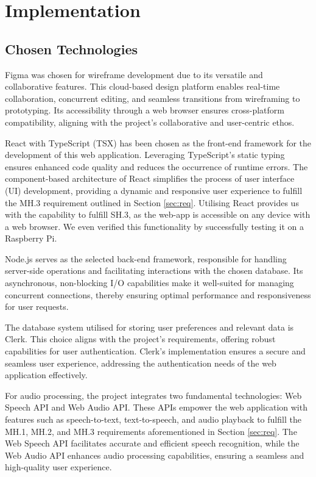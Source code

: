 \documentclass{l4proj}
\begin{document}
\chapter{Implementation}
\label{sec:implementation}

\section{Chosen Technologies}

Figma was chosen for wireframe development due to its versatile and collaborative features. This cloud-based design platform enables real-time collaboration, concurrent editing, and seamless transitions from wireframing to prototyping. Its accessibility through a web browser ensures cross-platform compatibility, aligning with the project's collaborative and user-centric ethos.

React with TypeScript (TSX) has been chosen as the front-end framework for the development of this web application. Leveraging TypeScript's static typing ensures enhanced code quality and reduces the occurrence of runtime errors. The component-based architecture of React simplifies the process of user interface (UI) development, providing a dynamic and responsive user experience to fulfill the MH.3 requirement outlined in Section \ref{sec:req}. Utilising React provides us with the capability to fulfill SH.3, as the web-app is accessible on any device with a web browser. We even verified this functionality by successfully testing it on a Raspberry Pi.

Node.js serves as the selected back-end framework, responsible for handling server-side operations and facilitating interactions with the chosen database. Its asynchronous, non-blocking I/O capabilities make it well-suited for managing concurrent connections, thereby ensuring optimal performance and responsiveness for user requests.

The database system utilised for storing user preferences and relevant data is Clerk. This choice aligns with the project's requirements, offering robust capabilities for user authentication. Clerk's implementation ensures a secure and seamless user experience, addressing the authentication needs of the web application effectively.

For audio processing, the project integrates two fundamental technologies: Web Speech API and Web Audio API. These APIs empower the web application with features such as speech-to-text, text-to-speech, and audio playback to fulfill the MH.1, MH.2, and MH.3 requirements aforementioned in Section \ref{sec:req}. The Web Speech API facilitates accurate and efficient speech recognition, while the Web Audio API enhances audio processing capabilities, ensuring a seamless and high-quality user experience.
\end{document}
